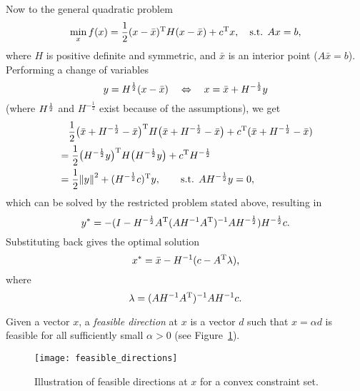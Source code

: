 \documentclass{article}
\begin{document}
Now to the general quadratic problem
\begin{equation*}
  \min_x f(x) = \frac{1}{2} (x - \bar{x})^{\mathrm{T}} H (x - \bar{x}) + c^{\mathrm{T}}x, \quad\text{s.t. } Ax = b,
\end{equation*}
where \(H\) is positive definite and symmetric, and \(\bar{x}\) is an interior point
(\(A\bar{x} = b\)).  Performing a change of variables
\begin{equation*}
  y = H^{\frac{1}{2}}(x - \bar{x}) \quad\Leftrightarrow\quad x = \bar{x} + H^{-\frac{1}{2}}y
\end{equation*}
(where \(H^{\frac{1}{2}}\) and \(H^{-\frac{1}{2}}\) exist because of the assumptions), we get
\begin{align*}
  &\quad \frac{1}{2} \T{\big( \bar{x} + H^{-\frac{1}{2}} - \bar{x} \big)} H
  \big( \bar{x} + H^{-\frac{1}{2}} - \bar{x} \big) + \T{c}(\bar{x} + H^{-\frac{1}{2}} - \bar{x})
  \\
  &= \frac{1}{2} \T{\big(H^{-\frac{1}{2}}y\big)} H \big(H^{-\frac{1}{2}}y\big) +
    \T{c}H^{-\frac{1}{2}} \\
  &= \frac{1}{2} \enVert{y}^2 + \T{(H^{-\frac{1}{2}}c)}y, \qquad\text{s.t. } AH^{-\frac{1}{2}}y = 0,
\end{align*}
which can be solved by the restricted problem stated above, resulting in
\begin{equation*}
  y^* = -(I - H^{-\frac{1}{2}}A^{\mathrm{T}} (AH^{-1}A^{\mathrm{T}})^{-1} A H^{-\frac{1}{2}}) H^{-\frac{1}{2}}c.
\end{equation*}
Substituting back gives the optimal solution
\begin{equation*}
  x^* = \bar{x} - H^{-1}(c - A^{\mathrm{T}}\lambda),
\end{equation*}
where
\begin{equation*}
  \lambda = (AH^{-1}A^{\mathrm{T}})^{-1} A H^{-1}c.
\end{equation*}

\label{s:feasible-direction-methods}

Given a vector \(x\), a \emph{feasible direction} at \(x\) is a vector \(d\) such that
\(x = \alpha d\) is feasible for all sufficiently small \(\alpha > 0\) (see
Figure~\ref{fig:feasible-directions}).

\begin{figure}[H]
  \centering
  \texttt{[image: feasible\_directions]}
  \caption{Illustration of feasible directions at \(x\) for a convex constraint
    set.\label{fig:feasible-directions}}
\end{figure}
\end{document}

